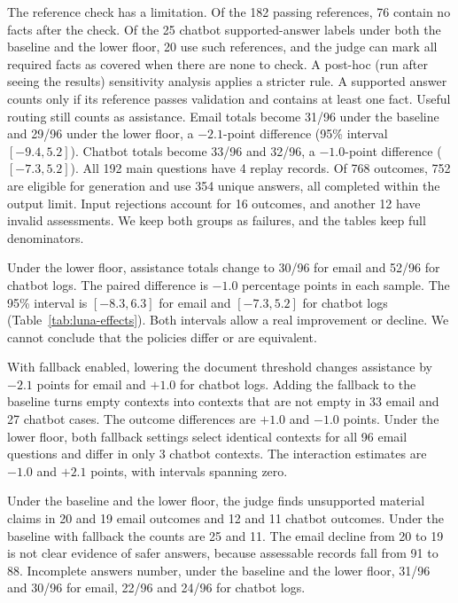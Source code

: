 \documentclass[a4paper,10pt,twocolumn]{article}
\begin{document}
The reference check has a limitation. Of the 182 passing references, 76 contain no facts after the check. Of the 25 chatbot supported-answer labels under both the baseline and the lower floor, 20 use such references, and the judge can mark all required facts as covered when there are none to check.
A post-hoc (run after seeing the results) sensitivity analysis applies a stricter rule. A supported answer counts only if its reference passes validation and contains at least one fact. Useful routing still counts as assistance. Email totals become 31/96 under the baseline and 29/96 under the lower floor, a $-2.1$-point difference (95\% interval $[-9.4,5.2]$). Chatbot totals become 33/96 and 32/96, a $-1.0$-point difference ($[-7.3,5.2]$).
All 192 main questions have 4 replay records. Of 768 outcomes, 752 are eligible for generation and use 354 unique answers, all completed within the output limit. Input rejections account for 16 outcomes, and another 12 have invalid assessments. We keep both groups as failures, and the tables keep full denominators.



Under the lower floor, assistance totals change to 30/96 for email and 52/96 for chatbot logs. The paired difference is $-1.0$ percentage points in each sample. The 95\% interval is $[-8.3,6.3]$ for email and $[-7.3,5.2]$ for chatbot logs (Table~\ref{tab:luna-effects}). Both intervals allow a real improvement or decline. We cannot conclude that the policies differ or are equivalent.

With fallback enabled, lowering the document threshold changes assistance by $-2.1$ points for email and $+1.0$ for chatbot logs. Adding the fallback to the baseline turns empty contexts into contexts that are not empty in 33 email and 27 chatbot cases. The outcome differences are $+1.0$ and $-1.0$ points. Under the lower floor, both fallback settings select identical contexts for all 96 email questions and differ in only 3 chatbot contexts. The interaction estimates are $-1.0$ and $+2.1$ points, with intervals spanning zero.

Under the baseline and the lower floor, the judge finds unsupported material claims in 20 and 19 email outcomes and 12 and 11 chatbot outcomes. Under the baseline with fallback the counts are 25 and 11. The email decline from 20 to 19 is not clear evidence of safer answers, because assessable records fall from 91 to 88. Incomplete answers number, under the baseline and the lower floor, 31/96 and 30/96 for email, 22/96 and 24/96 for chatbot logs.
\end{document}
